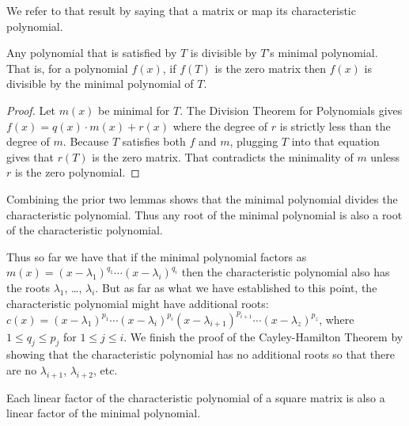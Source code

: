 We refer to that result by saying that a
matrix or map 
its characteristic polynomial.

\begin{lemma} \label{le:tSatisImpMinPolyDivides}
Any polynomial that is satisfied by \( T \) is divisible by
\( T \)'s minimal polynomial.
That is, for a polynomial \( f(x) \), if \( f(T) \) is the zero matrix 
then \( f(x) \) is divisible by the minimal polynomial of \( T \).
\end{lemma}

\begin{proof}
Let \( m(x) \) be minimal for \( T \).
The Division Theorem for Polynomials gives
\( f(x)=q(x)\cdot m(x)+r(x) \)
where the degree of \( r \) is strictly less than the degree of \( m \).
Because $T$ satisfies both $f$ and $m$, plugging $T$ into that equation gives
that \( r(T) \) is the zero matrix.
That contradicts the minimality of \( m \) unless \( r \)
is the zero polynomial.
\end{proof}

Combining the prior two lemmas shows that the minimal polynomial 
divides the characteristic polynomial. 
Thus
any root of the minimal polynomial is also a root of the characteristic
polynomial. 

Thus so far we have that if the minimal polynomial factors as
\( m(x)=(x-\lambda_1)^{q_1}\cdots(x-\lambda_i)^{q_i} \) then
the characteristic polynomial also has the roots \( \lambda_1\), \ldots, 
\( \lambda_i \).
But as far as what we have established to this point, 
the characteristic polynomial might have additional roots: 
\( c(x)=(x-\lambda_1)^{p_1}\cdots(x-\lambda_i)^{p_i}
     (x-\lambda_{i+1})^{p_{i+1}}\cdots(x-\lambda_z)^{p_z} \), where
\( 1\leq q_j\leq p_j \) for \( 1\leq j \leq i \).
We finish the proof of the Cayley-Hamilton Theorem by showing that 
the characteristic polynomial has no additional roots so that 
there are no $\lambda_{i+1}$, $\lambda_{i+2}$, etc.

\begin{lemma}
Each linear factor of the characteristic polynomial of a square matrix
is also a linear factor of the minimal polynomial.
\end{lemma}

